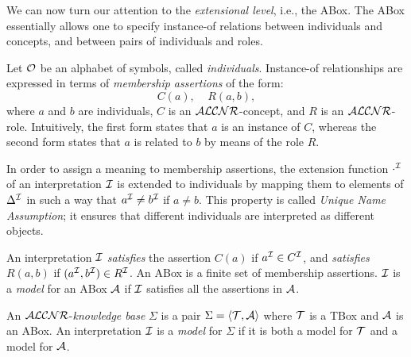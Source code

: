 
\baselineskip
We can now turn our attention to the {\em extensional
level}, i.e., the ABox. The ABox essentially
allows one to specify instance-of relations between individuals and
concepts, and between pairs of individuals and roles. 

Let ${\cal O}$ be an alphabet of symbols, called {\em individuals}. 
Instance-of relationships are expressed in terms of {\em membership 
assertions} of the form:
%
\[ C(a),~~~~~R(a,b), \]
%
where $a$ and $b$ are individuals, $C$ is an ${\cal ALCNR}$-concept, and
$R$ is an ${\cal ALCNR}$-role.
Intuitively, the first form states that $a$ is an instance of
$C$, whereas the second form states that $a$ is related to $b$ by means 
of the role $R$.

In order to assign a meaning to membership assertions,  
the extension function $\cdot^{\cal I}$ of an interpretation ${\cal I}$ is
extended to individuals by mapping them to elements of $\Delta^{\cal I}$ in such
a way that $a^{\cal I} \neq  b^{\cal I}$ if $a \neq b$.
This property is called 
{\em Unique Name Assumption}; it ensures that different individuals are
interpreted as different objects.

An interpretation ${\cal I}$ {\em satisfies} the assertion $C(a)$ if
$a^{\cal I} \in C^{\cal I}$, and {\em satisfies} $R(a,b)$ if $(a^{\cal I},b^{\cal I})  \in R^{\cal I}$. An ABox is a finite set of membership assertions. 
${\cal I}$ is a {\em model} for an ABox ${\cal A}$ if ${\cal I}$ 
satisfies all the assertions in ${\cal A}$.

\baselineskip

An ${\cal ALCNR}$-{\em knowledge base} $\Sigma$ is a pair 
$\Sigma = \langle{\cal T} ,{\cal A}\rangle $ where ${\cal T}$ is a TBox 
and ${\cal A}$ is an ABox. 
An interpretation ${\cal I}$ is a {\em model}
for  $\Sigma$ if it is both a model for ${\cal T}$ and a model for ${\cal A}$. 

